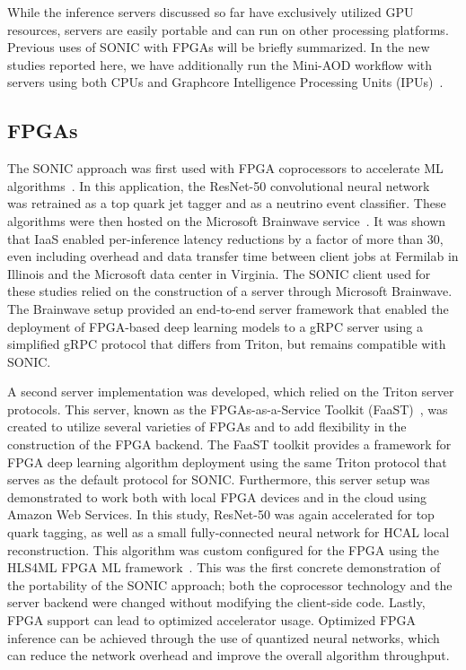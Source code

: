 While the inference servers discussed so far have exclusively utilized GPU resources, servers are easily portable and can run on other processing platforms. Previous uses of SONIC with FPGAs will be briefly summarized. In the new studies reported here, we have additionally run the Mini-AOD workflow with servers using both CPUs and Graphcore Intelligence Processing Units (IPUs)~\cite{Graphcore}.

\subsection{FPGAs}

The SONIC approach was first used with FPGA coprocessors to accelerate ML algorithms~\cite{Duarte:2019fta}. In this application, the ResNet-50 convolutional neural network~\cite{ResNet50} was retrained as a top quark jet tagger and as a neutrino event classifier. These algorithms were then hosted on the Microsoft Brainwave service~\cite{Brainwave}. It was shown that IaaS enabled per-inference latency reductions by a factor of more than 30, even including overhead and data transfer time between client jobs at Fermilab in Illinois and the Microsoft data center in Virginia. The SONIC client used for these studies relied on the construction of a server through Microsoft Brainwave. The Brainwave setup provided an end-to-end server framework that enabled the deployment of FPGA-based deep learning models to a gRPC server using a simplified gRPC protocol that differs from Triton, but remains compatible with SONIC. 

A second server implementation was developed, which relied on the Triton server protocols. This server, known as the FPGAs-as-a-Service Toolkit (FaaST)~\cite{FaaST}, was created to utilize several varieties of FPGAs and to add flexibility in the construction of the FPGA backend. The FaaST toolkit provides a framework for FPGA deep learning algorithm deployment using the same Triton protocol that serves as the default protocol for SONIC. Furthermore, this server setup was demonstrated to work both with local FPGA devices and in the cloud using Amazon Web Services. In this study, ResNet-50 was again accelerated for top quark tagging, as well as a small fully-connected neural network for HCAL local reconstruction. This algorithm was custom configured for the FPGA using the HLS4ML FPGA ML framework~\cite{Duarte:2018ite}. This was the first concrete demonstration of the portability of the SONIC approach; both the coprocessor technology and the server backend were changed without modifying the client-side code. Lastly, FPGA support can lead to optimized accelerator usage. Optimized FPGA inference can be achieved through the use of quantized neural networks, which can reduce the network overhead and improve the overall algorithm throughput. 

